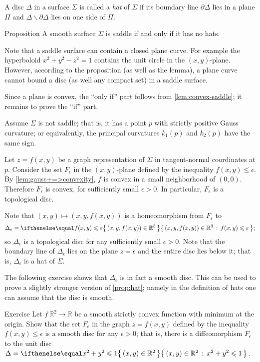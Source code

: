 A disc $\Delta$ in a surface $\Sigma$ is called a \emph{hat} of $\Sigma$
if its boundary line $\partial\Delta$ lies in a plane $\Pi$ and  $\Delta \backslash \partial \Delta $ lies on one side of $\Pi$.

\begin{thm}{Proposition}\label{prop:hat}
A smooth surface $\Sigma$ is saddle if and only if it has no hats.
\end{thm}

Note that a saddle surface can contain a closed plane curve.
For example the hyperboloid $x^2+y^2-z^2=1$ contains the unit circle in the $(x,y)$-plane.
However, according to the proposition (as well as the lemma), a plane curve cannot bound a disc (as well any compact set) in a saddle surface.

Since a plane is convex, the ``only if'' part follows from \ref{lem:convex-saddle};
it remains to prove the ``if'' part.

Assume $\Sigma$ is not saddle; that is, it has a point $p$ with strictly positive Gauss curvature;
or equivalently, the principal curvatures $k_1(p)$ and $k_2(p)$ have the same sign.


Let $z=f(x,y)$ be a graph representation of $\Sigma$ in tangent-normal coordinates at $p$.
Consider the set $F_\epsilon$ in the $(x,y)$-plane defined by the inequality $f(x,y)\le \epsilon$.
By \ref{lem:gauss+=>convexity}, $f$ is convex in a small neighborhood of $(0,0)$.
Therefore $F_\epsilon$ is convex, for sufficiently small $\epsilon>0$.
In particular, $F_\epsilon$ is a topological disc.

Note that $(x,y)\mapsto (x,y,f(x,y))$ is a homeomorphism from $F_\epsilon$
to
\[\Delta_\epsilon=\set{(x,y,f(x,y))\in \mathbb{R}^3}{f(x,y)\le \epsilon};\]
so $\Delta_\epsilon$ is a topological disc for any sufficiently small $\epsilon>0$.
Note that the boundary line of $\Delta_\epsilon$ lies on the plane $z=\epsilon$ and the entire disc lies below it;
that is, $\Delta_\epsilon$ is a hat of $\Sigma$.
\qeds

The following exercise shows that $\Delta_\epsilon$ is in fact a smooth disc.
This can be used to prove a slightly stronger version of \ref{prop:hat};
namely in the definition of hats one can assume that the disc is smooth.

\begin{thm}{Exercise}\label{ex:disc-hat}
Let $f\:\mathbb{R}^2\to\mathbb{R}$ be a smooth strictly convex function with minimum at the origin.
Show that the set $F_\epsilon$ in the graph $z=f(x,y)$ defined by the inequality $f(x,y)\le \epsilon$ is a smooth disc for any $\epsilon>0$;
that is, there is a diffeomorphism 
$F_\epsilon$ to the unit disc $\Delta\z=\set{(x,y)\in\mathbb{R}^2}{x^2+y^2\le 1}$.
\end{thm}

